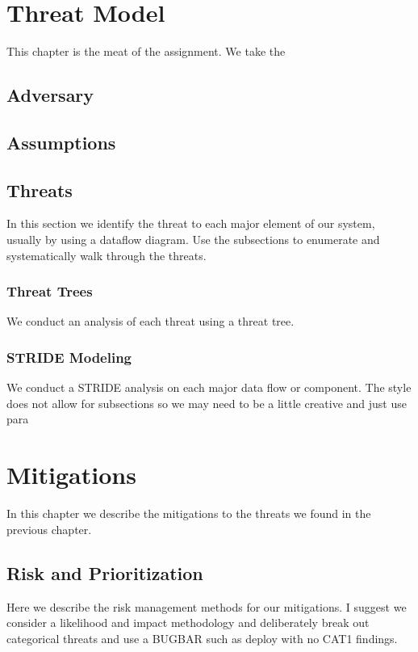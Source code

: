 \documentclass{tufte-book}
\begin{document}
\cleardoublepage
\chapter{Threat Model}
\label{ch:threatmodel}
This chapter is the meat of the assignment.  We take the 


\section{Adversary}
\label{sec:adversary}

\section{Assumptions}
\label{sec:assumptions}

\section{Threats}
\label{sec:threats}
In this section we identify the threat to each major element of our system, usually by using a dataflow diagram.  Use the subsections to enumerate and systematically walk through the threats.
\subsection{Threat Trees}
We conduct an analysis of each threat using a threat tree.

\subsection{STRIDE Modeling}
We conduct a STRIDE analysis on each major data flow or component.  The style does not allow for subsections so we may need to be a little creative and just use para

\cleardoublepage
\chapter{Mitigations}
\label{ch:mitigations}
In this chapter we describe the mitigations to the threats we found in the previous chapter.

\section{Risk and Prioritization}
\label{sec:risk}
Here we describe the risk management methods for our mitigations. I suggest we consider a likelihood and impact methodology and deliberately break out categorical threats and use a BUGBAR such as deploy with no CAT1 findings.
\end{document}
